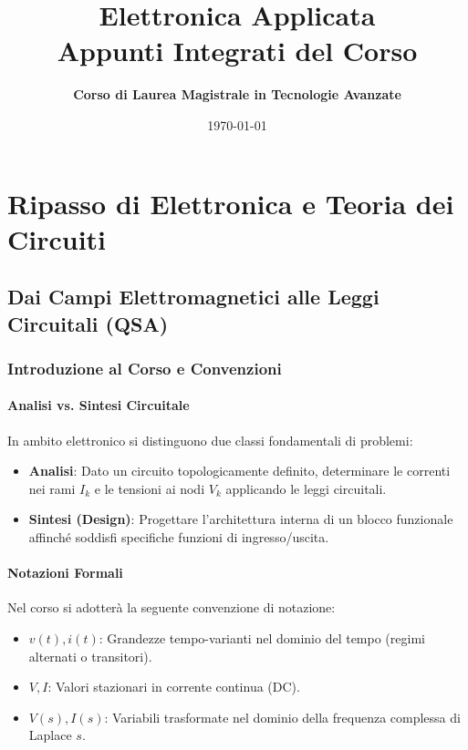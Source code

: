 \documentclass[12pt, a4paper]{report}
\title{\Huge \textbf{Elettronica Applicata}\\ \Large Appunti Integrati del Corso}
\author{\textbf{Corso di Laurea Magistrale in Tecnologie Avanzate}}
\date{\today}
\begin{document}
\maketitle

\cleardoublepage
\tableofcontents
\cleardoublepage

\part{Ripasso di Elettronica e Teoria dei Circuiti}

\chapter{Dai Campi Elettromagnetici alle Leggi Circuitali (QSA)}

\section{Introduzione al Corso e Convenzioni}
\subsection{Analisi vs. Sintesi Circuitale}
In ambito elettronico si distinguono due classi fondamentali di problemi:
\begin{itemize}
    \item \textbf{Analisi}: Dato un circuito topologicamente definito, determinare le correnti nei rami $I_k$ e le tensioni ai nodi $V_k$ applicando le leggi circuitali.
    \item \textbf{Sintesi (Design)}: Progettare l'architettura interna di un blocco funzionale affinché soddisfi specifiche funzioni di ingresso/uscita.
\end{itemize}

\subsection{Notazioni Formali}
Nel corso si adotterà la seguente convenzione di notazione:
\begin{itemize}
    \item $v(t), i(t)$: Grandezze tempo-varianti nel dominio del tempo (regimi alternati o transitori).
    \item $V, I$: Valori stazionari in corrente continua (DC).
    \item $V(s), I(s)$: Variabili trasformate nel dominio della frequenza complessa di Laplace $s$.
\end{itemize}
\end{document}
